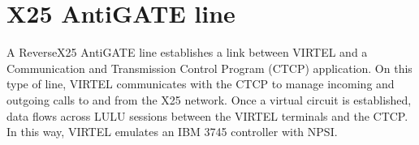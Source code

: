 \documentclass[letterpaper,10pt,english]{sphinxmanual}
\begin{document}
\begin{sphinxVerbatim}[commandchars=\\\{\}]
                     
                     
                                     
                
                                      
                                       
                                       
                                         
    
\end{sphinxVerbatim}

\sphinxAtStartPar
{}

\newpage

\ignorespaces 

\section{X25 AntiGATE line}
\label{\detokenize{connectivity_guide:x25-antigate-line}}\label{\detokenize{connectivity_guide:index-74}}
\sphinxAtStartPar
A Reverse\sphinxhyphen{}X25 AntiGATE line establishes a link between VIRTEL and a Communication and Transmission Control Program (CTCP) application. On this type of line, VIRTEL communicates with the CTCP to manage incoming and outgoing calls to and from the X25 network. Once a virtual circuit is established, data flows across LU\sphinxhyphen{}LU sessions between the VIRTEL terminals and the CTCP. In this way, VIRTEL emulates an IBM 3745 controller with NPSI.

\sphinxAtStartPar
{}

\ignorespaces 
\end{document}
